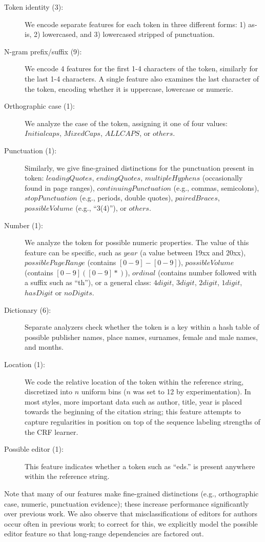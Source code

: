 \documentclass[10pt, a4paper]{article}
\begin{document}
\begin{description}
\item [Token identity (3):] We encode separate features for each
token in three different forms: 1) as-is, 2) lowercased, and 3)
lowercased stripped of punctuation.
\item [N-gram prefix/suffix (9):] We encode 4 features for the first 1-4
characters of the token, similarly for the last 1-4 characters.  A
single feature also examines the last character of the token, encoding
whether it is uppercase, lowercase or numeric.
\item [Orthographic case (1):] We analyze the case of the token,
assigning it one of four values: $Initialcaps$, $MixedCaps$,
$ALLCAPS$, or $others$.
\item[Punctuation (1):] Similarly, we give fine-grained distinctions
for the punctuation present in token: $leadingQuotes$, $endingQuotes$,
$multipleHyphens$ (occasionally found in page ranges),
$continuingPunctuation$ (e.g., commas, semicolons), $stopPunctuation$
(e.g., periods, double quotes), $pairedBraces$, $possibleVolume$ (e.g.,
``3(4)''), or $others$.
\item [Number (1):] We analyze the token for possible numeric
properties.  The value of this feature can be specific, such as $year$
(a value between 19xx and 20xx), $possiblePageRange$ (contains
$[0-9]-[0-9]$), $possibleVolume$ (contains $[0-9]([0-9]*)$), $ordinal$
(contains number followed with a suffix such as ``th''), or a general
class: $4digit$, $3digit$, $2digit$, $1digit$, $hasDigit$ or
$noDigits$.  
\item[Dictionary (6):] Separate analyzers check whether the token
is a key within a hash table of possible publisher names, place names,
surnames, female and male names, and months. 
\item[Location (1):] We code the relative location of the token within
the reference string, discretized into $n$ uniform bins ($n$ was set
to 12 by experimentation).  In most styles, more important data such
as author, title, year is placed towards the beginning of the citation
string; this feature attempts to capture regularities in position on
top of the sequence labeling strengths of the CRF learner.
\item[Possible editor (1):] This feature indicates whether a token
such as ``eds.'' is present anywhere within the reference string.  
\end{description}

Note that many of our features make fine-grained distinctions (e.g.,
orthographic case, numeric, punctuation evidence); these increase
performance significantly over previous work.  We also observe that
misclassifications of editors for authors occur often in previous
work; to correct for this, we explicitly model the possible editor
feature so that long-range dependencies are factored out.
\end{document}
